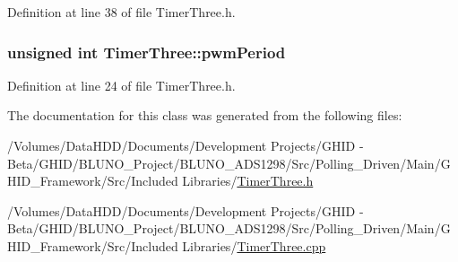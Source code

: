 \-Definition at line 38 of file \-Timer\-Three.\-h.

\hypertarget{class_timer_three_ad0b8c2a4aeb60ee88ee07c444946d70c}{
\subsubsection[{pwm\-Period}]{\setlength{\rightskip}{0pt plus 5cm}unsigned int {\bf \-Timer\-Three\-::pwm\-Period}}}\label{class_timer_three_ad0b8c2a4aeb60ee88ee07c444946d70c}


\-Definition at line 24 of file \-Timer\-Three.\-h.



\-The documentation for this class was generated from the following files\-:\begin{DoxyCompactItemize}
\item 
/\-Volumes/\-Data\-H\-D\-D/\-Documents/\-Development Projects/\-G\-H\-I\-D -\/ Beta/\-G\-H\-I\-D/\-B\-L\-U\-N\-O\-\_\-\-Project/\-B\-L\-U\-N\-O\-\_\-\-A\-D\-S1298/\-Src/\-Polling\-\_\-\-Driven/\-Main/\-G\-H\-I\-D\-\_\-\-Framework/\-Src/\-Included Libraries/\hyperlink{_timer_three_8h}{\-Timer\-Three.\-h}\item 
/\-Volumes/\-Data\-H\-D\-D/\-Documents/\-Development Projects/\-G\-H\-I\-D -\/ Beta/\-G\-H\-I\-D/\-B\-L\-U\-N\-O\-\_\-\-Project/\-B\-L\-U\-N\-O\-\_\-\-A\-D\-S1298/\-Src/\-Polling\-\_\-\-Driven/\-Main/\-G\-H\-I\-D\-\_\-\-Framework/\-Src/\-Included Libraries/\hyperlink{_timer_three_8cpp}{\-Timer\-Three.\-cpp}\end{DoxyCompactItemize}
